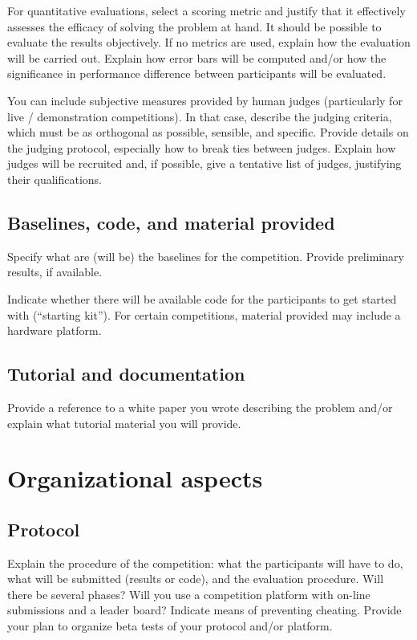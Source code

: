 \documentclass[11pt, oneside]{article}
\begin{document}
For quantitative evaluations, select a scoring metric and justify
that it effectively assesses the efficacy of solving the problem
at hand. It should be possible to evaluate the results
objectively. If no metrics are used, explain how the evaluation
will be carried out. Explain how error bars will be computed and/or how the significance in performance difference between participants will be evaluated.

You can include subjective measures provided by human judges (particularly for live /  demonstration competitions). In that case, describe the judging criteria, which must be as orthogonal as possible, sensible, and specific. Provide details on the judging protocol, especially how to break ties between judges. Explain how judges will be recruited and, if possible, give a tentative list of judges, justifying their qualifications.

\subsection{Baselines, code, and material provided}

Specify what are (will be) the baselines for the competition. Provide preliminary results, if available.

Indicate
whether there will be available code for the participants to get started with (``starting kit''). For certain competitions, material provided may include a hardware platform.

\subsection{Tutorial and documentation}

Provide a reference to a white paper you wrote describing the
problem and/or explain what tutorial material you will provide.


\section{Organizational aspects}
\subsection{Protocol}

Explain the procedure of the competition: what the participants will have to do, what will be submitted (results or code), and the evaluation procedure.
Will there be several phases? Will you use a competition platform with on-line submissions and a leader board? Indicate means of preventing cheating.
Provide your plan to organize beta tests of your protocol and/or platform.
\end{document}
